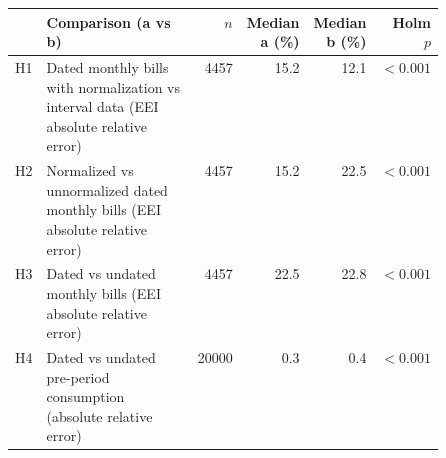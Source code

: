 \begin{tabular}{lp{0.5\linewidth}rrrr}
\hline
 & Comparison (a vs b) & $n$ & Median a (\%) & Median b (\%) & Holm $p$ \\
\hline
H1 & Dated monthly bills with normalization vs interval data (EEI absolute relative error) & 4457 & 15.2 & 12.1 & $<0.001$ \\
H2 & Normalized vs unnormalized dated monthly bills (EEI absolute relative error) & 4457 & 15.2 & 22.5 & $<0.001$ \\
H3 & Dated vs undated monthly bills (EEI absolute relative error) & 4457 & 22.5 & 22.8 & $<0.001$ \\
H4 & Dated vs undated pre-period consumption (absolute relative error) & 20000 & 0.3 & 0.4 & $<0.001$ \\
\hline
\end{tabular}
